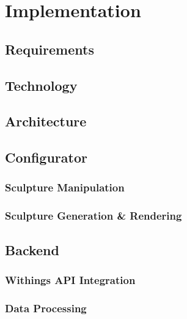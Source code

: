\label{ch:conf}

\section{Implementation}
\subsection{Requirements}
\subsection{Technology}
\subsection{Architecture}
\subsection{Configurator}
\subsubsection{Sculpture Manipulation}
\subsubsection{Sculpture Generation \& Rendering}
\subsection{Backend}
\subsubsection{Withings API Integration}
\subsubsection{Data Processing}
